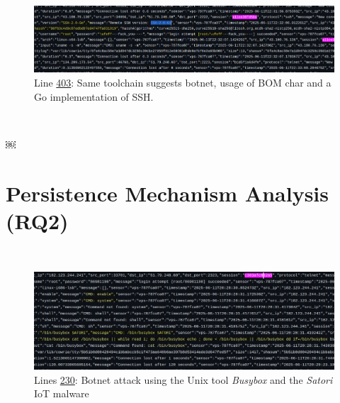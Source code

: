 \begin{figure}[h!]
    \centering
    \includegraphics[width=1\linewidth]{doc/img/annex_d_credentials1.png}
    \caption*{Line \href{https://github.com/nottoBD/netsec-honeypot/blob/master/log/cowrie.json.2025-06-11}{403}: Same toolchain suggests botnet, usage of BOM char and a Go implementation of SSH.}
\end{figure}

\
\


\newpage
￼
\section{Persistence Mechanism Analysis (RQ2)}  
\label{annex:log-persistence1}  
\

\begin{figure}[h!]
    \centering
    \includegraphics[width=1\linewidth]{doc//img/annex_e_log_persistence_satori.png}
    \caption*{Lines \href{https://github.com/nottoBD/netsec-honeypot/blob/master/log/cowrie.json.2025-06-11}{230}: Botnet attack  using the Unix tool \textit{Busybox} and the \textit{Satori} IoT malware} 
\end{figure}
\
\
\newpage



